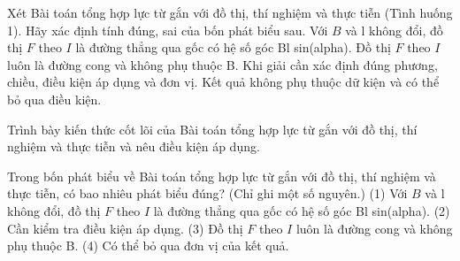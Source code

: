 

\begin{ex}
Xét Bài toán tổng hợp lực từ gắn với đồ thị, thí nghiệm và thực tiễn (Tình huống 1). Hãy xác định tính đúng, sai của bốn phát biểu sau.
\choiceTF
{\True Với $B$ và l không đổi, đồ thị $F$ theo $I$ là đường thẳng qua gốc có hệ số góc Bl sin(alpha).}
{Đồ thị $F$ theo $I$ luôn là đường cong và không phụ thuộc B.}
{\True Khi giải cần xác định đúng phương, chiều, điều kiện áp dụng và đơn vị.}
{Kết quả không phụ thuộc dữ kiện và có thể bỏ qua điều kiện.}
\end{ex}

\begin{bt}
Trình bày kiến thức cốt lõi của Bài toán tổng hợp lực từ gắn với đồ thị, thí nghiệm và thực tiễn và nêu điều kiện áp dụng.
\end{bt}

\begin{ex}
Trong bốn phát biểu về Bài toán tổng hợp lực từ gắn với đồ thị, thí nghiệm và thực tiễn, có bao nhiêu phát biểu đúng? (Chỉ ghi một số nguyên.) (1) Với $B$ và l không đổi, đồ thị $F$ theo $I$ là đường thẳng qua gốc có hệ số góc Bl sin(alpha). (2) Cần kiểm tra điều kiện áp dụng. (3) Đồ thị $F$ theo $I$ luôn là đường cong và không phụ thuộc B. (4) Có thể bỏ qua đơn vị của kết quả.
\end{ex}

